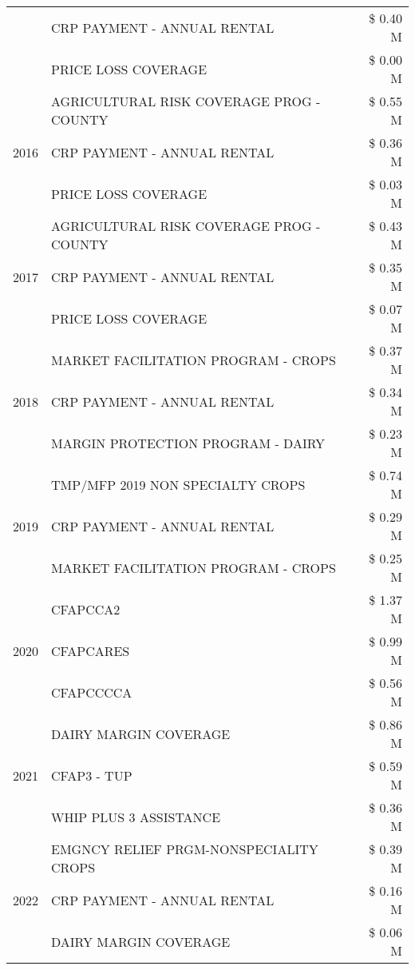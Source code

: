 \begin{tabular}{llr}
 & CRP PAYMENT - ANNUAL RENTAL & \$ 0.40 M \\
 & PRICE LOSS COVERAGE & \$ 0.00 M \\
\cline{1-3}
\multirow[t]{3}{*}{2016} & AGRICULTURAL RISK COVERAGE PROG - COUNTY & \$ 0.55 M \\
 & CRP PAYMENT - ANNUAL RENTAL & \$ 0.36 M \\
 & PRICE LOSS COVERAGE & \$ 0.03 M \\
\cline{1-3}
\multirow[t]{3}{*}{2017} & AGRICULTURAL RISK COVERAGE PROG - COUNTY & \$ 0.43 M \\
 & CRP PAYMENT - ANNUAL RENTAL & \$ 0.35 M \\
 & PRICE LOSS COVERAGE & \$ 0.07 M \\
\cline{1-3}
\multirow[t]{3}{*}{2018} & MARKET FACILITATION PROGRAM - CROPS & \$ 0.37 M \\
 & CRP PAYMENT - ANNUAL RENTAL & \$ 0.34 M \\
 & MARGIN PROTECTION PROGRAM - DAIRY & \$ 0.23 M \\
\cline{1-3}
\multirow[t]{3}{*}{2019} & TMP/MFP 2019 NON SPECIALTY CROPS & \$ 0.74 M \\
 & CRP PAYMENT - ANNUAL RENTAL & \$ 0.29 M \\
 & MARKET FACILITATION PROGRAM - CROPS & \$ 0.25 M \\
\cline{1-3}
\multirow[t]{3}{*}{2020} & CFAPCCA2 & \$ 1.37 M \\
 & CFAPCARES & \$ 0.99 M \\
 & CFAPCCCCA & \$ 0.56 M \\
\cline{1-3}
\multirow[t]{3}{*}{2021} & DAIRY MARGIN COVERAGE & \$ 0.86 M \\
 & CFAP3 - TUP & \$ 0.59 M \\
 & WHIP PLUS 3 ASSISTANCE & \$ 0.36 M \\
\cline{1-3}
\multirow[t]{3}{*}{2022} & EMGNCY RELIEF PRGM-NONSPECIALITY CROPS & \$ 0.39 M \\
 & CRP PAYMENT - ANNUAL RENTAL & \$ 0.16 M \\
 & DAIRY MARGIN COVERAGE & \$ 0.06 M \\
\cline{1-3}
\bottomrule
\end{tabular}

